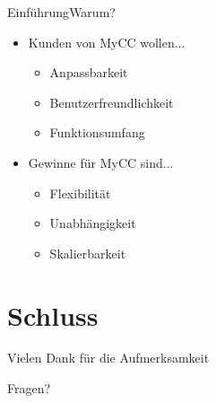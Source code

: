 \documentclass[t,aspectratio=169,divpsnames]{beamer}
\begin{document}
\begin{frame}{Einführung}{Warum?}
	\begin{itemize}
		\item<1-> Kunden von MyCC wollen...
			\begin{itemize}
				\item<2-> Anpassbarkeit 
				\item<3-> Benutzerfreundlichkeit
				\item<4-> Funktionsumfang
			\end{itemize}
		\item<5-> Gewinne für MyCC sind...
			\begin{itemize}
				\item<6-> Flexibilität
				\item<7-> Unabhängigkeit
				\item<8-> Skalierbarkeit
			\end{itemize}
	\end{itemize}
\end{frame}

\section*{Schluss}
\begin{frame}
	\begin{center}
		\huge{Vielen Dank für die Aufmerksamkeit}
	\end{center}
	\begin{center}
		\Huge{Fragen?}
	\end{center}
\end{frame}

\begin{frame}[allowframebreaks]{\bibname}
\end{frame}
\end{document}
